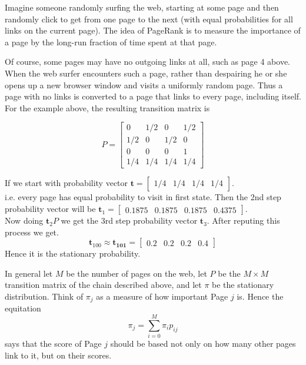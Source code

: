 Imagine someone randomly surfing the web, starting at some page and 
then randomly click to get from one page to the next (with equal probabilities for
all links on the current page).
 The idea of PageRank is to measure the importance
of a page by the long-run fraction of time spent at that page.

Of course, some pages may have no outgoing links at all, such as page 4 above. When
the web surfer encounters such a page, rather than despairing he or she opens up a
new browser window and visits a uniformly random page. Thus a page with no links
is converted to a page that links to every page, including itself. For the example
above, the resulting transition matrix is

\[
    P =
    \begin{bmatrix}
        0 & 1/2 & 0 & 1/2 \\ 
        1/2 & 0 & 1/2 & 0 \\ 
        0 & 0 & 0 & 1 \\
        1/4 & 1/4 & 1/4 & 1/4
    \end{bmatrix} 
\]

If we start with probability vector 
$ \mathbf{t} = \begin{bmatrix}
    1/4 & 1/4 & 1/4 & 1/4 
\end{bmatrix}  $.\\ 
i.e. every page has equal probability to visit in first state. Then the 2nd step 
probability vector will be 
$\mathbf{t}_{1}= 
    \begin{bmatrix}
        0.1875 & 0.1875 & 0.1875 & 0.4375 
    \end{bmatrix} 
$.\\ 
Now doing $ \mathbf{t}_{2}P $ we get the 3rd step probability vector $ \mathbf{t}_{3} $.
After reputing this process we get.
\[
    \mathbf{t}_{100} \approx \mathbf{t_{101}} = \begin{bmatrix}
        0.2 & 0.2 & 0.2 & 0.4 
    \end{bmatrix} 
\]
Hence it is the stationary probability.

In general let $ M $ be the number of pages on the web, let  $ P $ be the  $ M\times M $
transition matrix of the chain described above, and 
let $ \pi $ be the stationary distribution.
Think of $ \pi_{j} $ as a measure of how important Page $j$ is. 
Hence the equitation 
\[
    \pi_{j}=\sum_{i=0}^{M} \pi_{i}p_{ij}
\]
says that the score of Page $j$ should be based not only on how many other pages link
to it, but on their scores.

